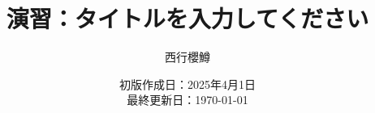 \newcommand{\CATEGORY}{演習}%
\newcommand{\TITLE}{タイトルを入力してください}
\newcommand{\AUTHORNAME}{西行櫻鱒}
\newcommand{\CREATEDAT}{2025年4月1日}

\title{\CATEGORY：\TITLE}
\author{\AUTHORNAME}
\date{初版作成日：\CREATEDAT\\最終更新日：\today\\}

